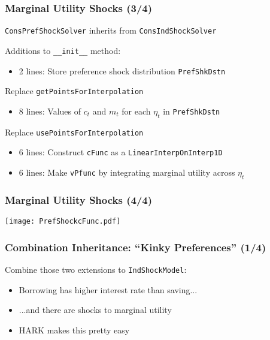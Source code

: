 \documentclass[11ptt]{beamer}
\begin{document}
\begin{frame}
  \frametitle{Marginal Utility Shocks (3/4)}
  \texttt{ConsPrefShockSolver} inherits from \texttt{ConsIndShockSolver}

  \begin{block}{Additions to \texttt{\_\_init\_\_} method:}
    \begin{itemize}
    \item 2 lines: Store preference shock distribution \texttt{PrefShkDstn}
    \end{itemize}
  \end{block}

  \begin{block}{Replace \texttt{getPointsForInterpolation}}
    \begin{itemize}
    \item 8 lines: Values of $c_t$ and $m_t$ for each $\eta_t$ in \texttt{PrefShkDstn}
    \end{itemize}
  \end{block}

  \begin{block}{Replace \texttt{usePointsForInterpolation}}
    \begin{itemize}
    \item 6 lines: Construct \texttt{cFunc} as a \texttt{LinearInterpOnInterp1D}

    \item 6 lines: Make \texttt{vPfunc} by integrating marginal utility across $\eta_t$
    \end{itemize}
  \end{block}
\end{frame}

\begin{frame}
  \frametitle{Marginal Utility Shocks (4/4)}
  \begin{center}
    \texttt{[image: PrefShockcFunc.pdf]}
  \end{center}
\end{frame}

\begin{frame}
  \frametitle{Combination Inheritance: ``Kinky Preferences'' (1/4)}
  Combine those two extensions to \texttt{IndShockModel}:
  \begin{itemize}
  \item Borrowing has higher interest rate than saving...

  \item ...and there are shocks to marginal utility

  \item HARK makes this pretty easy
  \end{itemize}
\end{frame}
\end{document}
